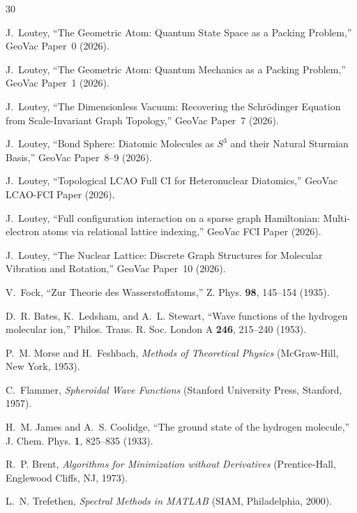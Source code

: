\documentclass[aps,pra,twocolumn,superscriptaddress,longbibliography]{revtex4-2}
\begin{document}
\begin{thebibliography}{30}

J.~Loutey,
``The Geometric Atom: Quantum State Space as a Packing Problem,''
GeoVac Paper~0 (2026).

J.~Loutey,
``The Geometric Atom: Quantum Mechanics as a Packing Problem,''
GeoVac Paper~1 (2026).

J.~Loutey,
``The Dimensionless Vacuum: Recovering the Schr\"odinger Equation
from Scale-Invariant Graph Topology,''
GeoVac Paper~7 (2026).

J.~Loutey,
``Bond Sphere: Diatomic Molecules as $S^3$ and their Natural
Sturmian Basis,''
GeoVac Paper~8--9 (2026).

J.~Loutey,
``Topological LCAO Full CI for Heteronuclear Diatomics,''
GeoVac LCAO-FCI Paper (2026).

J.~Loutey,
``Full configuration interaction on a sparse graph Hamiltonian:
Multi-electron atoms via relational lattice indexing,''
GeoVac FCI Paper (2026).

J.~Loutey,
``The Nuclear Lattice: Discrete Graph Structures for Molecular
Vibration and Rotation,''
GeoVac Paper~10 (2026).

V.~Fock,
``Zur Theorie des Wasserstoffatoms,''
Z. Phys. \textbf{98}, 145--154 (1935).

D.~R. Bates, K.~Ledsham, and A.~L. Stewart,
``Wave functions of the hydrogen molecular ion,''
Philos. Trans. R. Soc. London A \textbf{246}, 215--240 (1953).

P.~M. Morse and H.~Feshbach,
\textit{Methods of Theoretical Physics}
(McGraw-Hill, New York, 1953).

C.~Flammer,
\textit{Spheroidal Wave Functions}
(Stanford University Press, Stanford, 1957).

H.~M. James and A.~S. Coolidge,
``The ground state of the hydrogen molecule,''
J. Chem. Phys. \textbf{1}, 825--835 (1933).

R.~P. Brent,
\textit{Algorithms for Minimization without Derivatives}
(Prentice-Hall, Englewood Cliffs, NJ, 1973).

L.~N. Trefethen,
\textit{Spectral Methods in MATLAB}
(SIAM, Philadelphia, 2000).

\end{thebibliography}
\end{document}
